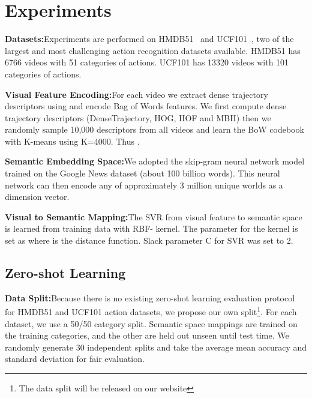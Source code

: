 \documentclass{article}
\begin{document}
\vspace{-0.3cm}
\section{Experiments}

\noindent\textbf{Datasets:}\quad Experiments are performed on HMDB51~\cite{Kuehne2011} and UCF101~\cite{Soomro2012}, two of the largest and most challenging action recognition datasets available. HMDB51 has 6766 videos with 51 categories of actions. UCF101 has 13320 videos with 101 categories of actions. 

\noindent\textbf{Visual Feature Encoding:}\quad For each video we extract dense trajectory descriptors using \cite{Wang2013} and encode Bag of Words features. We first compute dense trajectory descriptors (DenseTrajectory, HOG, HOF and MBH) then we randomly sample 10,000 descriptors from all videos and learn the BoW codebook with K-means using K=4000. Thus .

\noindent\textbf{Semantic Embedding Space:}\quad  We adopted the skip-gram neural network model \cite{Mikolov2013} trained on the Google News dataset (about 100 billion words). This neural network can then encode any of approximately 3 million unique worlds as a  dimension vector. 

\noindent\textbf{Visual to Semantic Mapping:}\quad The SVR from visual feature  to semantic space  is learned from training data with RBF- kernel. The  parameter for the kernel is set as  where  is the  distance function. Slack parameter C  for SVR was set to 2.

\vspace{-0.1cm}
\subsection{Zero-shot Learning}\label{sect:exp_ZSL}


\noindent\textbf{Data Split:}\quad Because there is no existing zero-shot learning evaluation protocol for HMDB51 and UCF101 action datasets, we propose our own split\footnote{The data split will be released on our website}. For each dataset, we use a 50/50 category split. Semantic space mappings are trained on the  training categories, and the other  are held out unseen until test time. We randomly generate 30 independent splits and take the average mean accuracy and standard deviation for fair evaluation.
\end{document}

